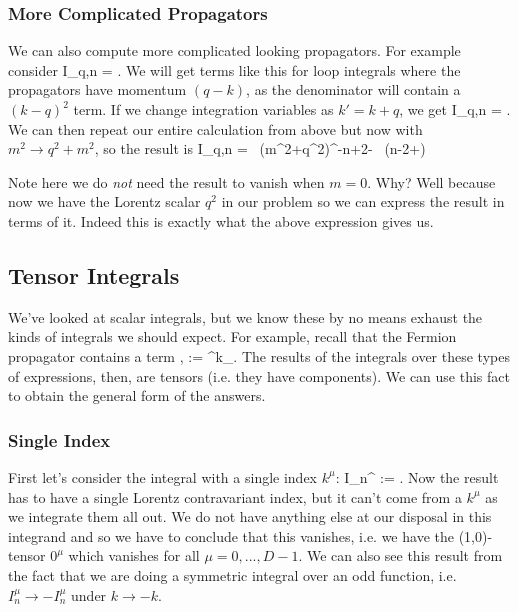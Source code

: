 \subsubsection{More Complicated Propagators}

We can also compute more complicated looking propagators. For example consider 
\bse 
    I_{q,n} = \int {} .
\ese 
We will get terms like this for loop integrals where the propagators have momentum $(q-k)$, as the denominator will contain a $(k-q)^2$ term. If we change integration variables as $k'=k+q$, we get 
\bse 
    I_{q,n} = \int {} .
\ese 
We can then repeat our entire calculation from above but now with $m^2\to q^2+m^2$, so the result is 
\bse 
    I_{q,n} =  \,  \big(m^2+q^2\big)^{-n+2-\epsilon} \, \Gamma\big(n-2+\epsilon\big)
\ese

\br 
    Note here we do \textit{not} need the result to vanish when $m=0$. Why? Well because now we have the Lorentz scalar $q^2$ in our problem so we can express the result in terms of it. Indeed this is exactly what the above expression gives us. 
\er 

\subsection{Tensor Integrals}

We've looked at scalar integrals, but we know these by no means exhaust the kinds of integrals we should expect. For example, recall that the Fermion propagator contains a term
\bse 
    , \qquad {} := \g^{\mu}k_{\mu}.
\ese 
The results of the integrals over these types of expressions, then, are tensors (i.e. they have components). We can use this fact to obtain the general form of the answers. 

\subsubsection{Single Index}

First let's consider the integral with a single index $k^{\mu}$:
\bse 
    I_n^{\mu} := \int {} .
\ese 
Now the result has to have a single Lorentz contravariant index, but it can't come from a $k^{\mu}$ as we integrate them all out. We do not have anything else at our disposal in this integrand and so we have to conclude that this vanishes, i.e. we have the (1,0)-tensor $0^{\mu}$ which vanishes for all $\mu=0,...,D-1$. We can also see this result from the fact that we are doing a symmetric integral over an odd function, i.e. $I^{\mu}_n \to -I_n^{\mu}$ under $k\to -k$. 

